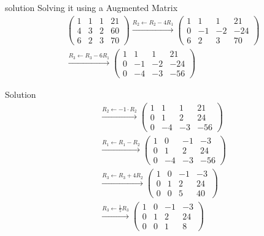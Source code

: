 \documentclass{beamer}
\begin{document}
\begin{frame}{solution}
Solving it using a Augmented Matrix
\begin{align}
&\left(
\begin{array}{ccc|c}
1 & 1 & 1 & 21 \\
4 & 3 & 2 & 60 \\
6 & 2 & 3 & 70
\end{array}
\right)
\xrightarrow{R_2 \gets R_2 - 4R_1}
\left(
\begin{array}{ccc|c}
1 & 1 & 1 & 21 \\
0 & -1 & -2 & -24 \\
6 & 2 & 3 & 70
\end{array}
\right) \\[12pt]
&\xrightarrow{R_3 \gets R_3 - 6R_1}
\left(
\begin{array}{ccc|c}
1 & 1 & 1 & 21 \\
0 & -1 & -2 & -24 \\
0 & -4 & -3 & -56
\end{array}
\right) 
\end{align}
\end{frame}
\begin{frame}{Solution}
\begin{align}
&\xrightarrow{R_2 \gets -1 \cdot R_2}
\left(
\begin{array}{ccc|c}
1 & 1 & 1 & 21 \\
0 & 1 & 2 & 24 \\
0 & -4 & -3 & -56
\end{array}
\right) \\[12pt]
&\xrightarrow{R_1 \gets R_1 - R_2}
\left(
\begin{array}{ccc|c}
1 & 0 & -1 & -3 \\
0 & 1 & 2 & 24 \\
0 & -4 & -3 & -56
\end{array}
\right) \\[12pt]
&\xrightarrow{R_3 \gets R_3 + 4R_2}
\left(
\begin{array}{ccc|c}
1 & 0 & -1 & -3 \\
0 & 1 & 2 & 24 \\
0 & 0 & 5 & 40
\end{array}
\right) \\[12pt]
&\xrightarrow{R_3 \gets \frac{1}{5} R_3}
\left(
\begin{array}{ccc|c}
1 & 0 & -1 & -3 \\
0 & 1 & 2 & 24 \\
0 & 0 & 1 & 8
\end{array}
\right) 
\end{align}
\end{frame}
\end{document}
